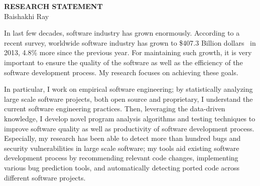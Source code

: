 \documentclass[a4paper, 11pt]{article}
\begin{document}
\thispagestyle{fancy}
\lhead{}
\rhead{}


\pagestyle{fancy}
\rhead{\grayline{\thepage/\totalpages{}}}

\begin{small}

\begin{center}
{\large \bf RESEARCH STATEMENT}\\
\vspace*{0.4cm}
{\normalsize Baishakhi Ray}%
\end{center}

In last few decades, software industry has grown enormously. According to a recent survey,
worldwide software industry has grown to \$407.3 Billion dollars~\cite{Gartner13} in 2013,
4.8\% more since the previous year. For maintaining such growth, it is very important to ensure
the quality of the software as well as the efficiency of the software development process. My
research focuses on achieving these goals.  

In particular, I work on empirical software engineering; by statistically analyzing large scale
software projects, both open source and proprietary, I understand the current software
engineering practices. Then, leveraging the data-driven knowledge, I develop novel program
analysis algorithms and testing techniques to improve software quality as well as productivity
of software development process. Especially, my research has been able to detect more than
hundred bugs and security vulnerabilities in large scale software; my tools aid existing 
software development process by recommending relevant code changes, implementing
various bug prediction tools, and automatically detecting ported code across different 
software projects.  



\end{small}
\end{document}
